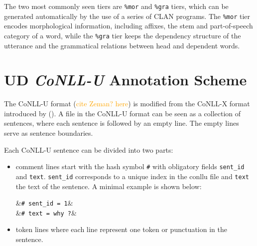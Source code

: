 The two most commonly seen tiers are \texttt{\%mor} and \texttt{\%gra} tiers, which can be generated automatically by the use of a series of CLAN programs. The \texttt{\%mor} tier encodes morphological information, including affixes, the stem and part-of-speech category of a word, while the \texttt{\%gra} tier keeps the dependency structure of the utterance and the grammatical relations between head and dependent words.

\newcommand{\conllu}[1]{&\footnotesize\texttt{#1}}
\newcommand{\tab}{&\hspace{0.1em}}
\setlength{\abovedisplayskip}{3pt}
\setlength{\belowdisplayskip}{3pt}
\vspace{-1em}
\section{UD \emph{CoNLL-U} Annotation Scheme}\label{sec:conllu}

The CoNLL-U format (\textcolor{orange}{cite Zeman? here}) is modified from the CoNLL-X format introduced by (\cite{buchholz-marsi-2006-conll}). A file in the CoNLL-U format can be seen as a collection of sentences, where each sentence is followed by an empty line. The empty lines serve as sentence boundaries.

Each CoNLL-U sentence can be divided into two parts:
\begin{itemize}
	\item comment lines start with the hash symbol \texttt{\#} with obligatory fields \texttt{sent\_id} and \texttt{text}. \texttt{sent\_id} corresponds to a unique index in the conllu file and \texttt{text} the text of the sentence. A minimal example is shown below:
	\begin{flalign*}
	\conllu{\# sent\_id = 1}&\\
	\conllu{\# text = why ?}&
	\end{flalign*}
	\item token lines where each line represent one token or punctuation in the sentence.
\end{itemize}

